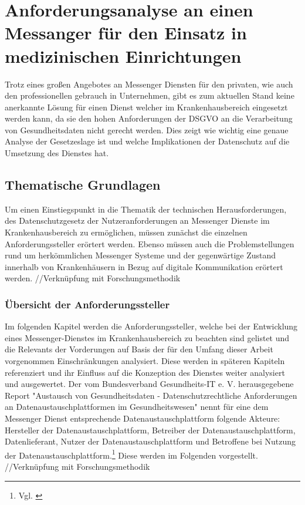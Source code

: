 \chapter{Anforderungsanalyse an einen Messanger für den Einsatz in medizinischen Einrichtungen}\label{chapter:ganforderungen}
Trotz eines großen Angebotes an Messenger Diensten für den privaten, wie auch den professionellen gebrauch in Unternehmen, gibt es zum aktuellen Stand keine anerkannte Lösung für einen Dienst welcher im Krankenhausbereich eingesetzt werden kann, da sie den hohen Anforderungen der DSGVO an die Verarbeitung von Gesundheitsdaten nicht gerecht werden. Dies zeigt wie wichtig eine genaue Analyse der Gesetzeslage ist und welche Implikationen der Datenschutz auf die Umsetzung des Dienstes hat.

\section{Thematische Grundlagen}\label{chapter:hintergrund}
Um einen Einstiegspunkt in die Thematik der technischen Herausforderungen, des Datenschutzgesetz der Nutzeranforderungen an Messenger Dienste im Krankenhausbereich zu ermöglichen, müssen zunächst die einzelnen Anforderungssteller erörtert werden. Ebenso müssen auch die Problemstellungen rund um herkömmlichen Messenger Systeme und der gegenwärtige Zustand innerhalb von Krankenhäusern in Bezug auf digitale Kommunikation erörtert werden.
//Verknüpfung mit Forschungsmethodik

\subsection{Übersicht der Anforderungssteller}\label{section:ueda}
Im folgenden Kapitel werden die Anforderungssteller, welche bei der Entwicklung eines Messenger-Dienstes im Krankenhausbereich zu beachten sind gelistet und die Relevants der Vorderungen auf Basis der für den Umfang dieser Arbeit vorgenommen Einschränkungen analysiert. Diese werden in späteren Kapiteln referenziert und ihr Einfluss auf die Konzeption des Dienstes weiter analysiert und ausgewertet. Der vom Bundesverband Gesundheits-IT e. V. herausgegebene Report "Austausch von Gesundheitsdaten - Datenschutzrechtliche Anforderungen an Datenaustauschplattformen im Gesundheitswesen" nennt für eine dem Messenger Dienst entsprechende Datenaustauschplattform folgende Akteure: Hersteller der Datenaustauschplattform, Betreiber der Datenaustauschplattform, Datenlieferant, Nutzer der Datenaustauschplattform und Betroffene bei Nutzung der Datenaustauschplattform.\footnote{Vgl. \cite[S. 13]{Schubert2014}} Diese werden im Folgenden vorgestellt.
//Verknüpfung mit Forschungsmethodik


